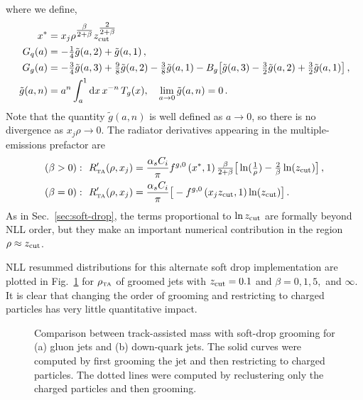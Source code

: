 \documentclass[letterpaper,11pt]{article}
\newcommand{\Fig}[1]{Fig.~\ref{#1}}
\newcommand{\Sec}[1]{Sec.~\ref{#1}}
\begin{document}
where we define,
\begin{align}
x^* &= x_j\rho^{\tfrac{\beta}{2+\beta}}z_{\rm cut}^{\tfrac{2}{2+\beta}} \\
G_q(a) &= -\tfrac{1}{4}\tilde{g}(a,2) + \tilde{g}(a,1)\,,\\
G_g(a) &=  - \tfrac{3}{4}\tilde{g}(a,3) + \tfrac{9}{8}\tilde{g}(a,2) - \tfrac{3}{8}\tilde{g}(a,1) - B_g \big[\tilde{g}(a,3) - \tfrac{3}{2}\tilde{g}(a,2) + \tfrac{3}{2}\tilde{g}(a,1)\big]\,,\\
\tilde{g}(a,n) &= a^n \int_{a}^1\text{d}x\, x^{-n}\,T_g(x), \ \ \ \lim_{a\rightarrow 0} \tilde{g}(a,n) = 0\,.
\end{align}
Note that the quantity $\tilde{g}(a,n)$ is well defined as $a\rightarrow 0$, so there is no divergence as $x_j\rho \rightarrow 0$. 
%
The radiator derivatives appearing in the multiple-emissions prefactor are
\begin{align}
\label{eq:track-first-rderiv-betagt0}
(\beta > 0):& \ \ R_{\mbox{\tiny TA}}'(\rho,x_j) = \frac{\alpha_sC_i}{\pi}f^{g,0}\left(x^*,1\right)\tfrac{\beta}{2+\beta} \big[\ln(\tfrac{1}{\rho})- \tfrac{2}{\beta}\ln(z_{\rm cut})\big]\,, \\ 
\label{eq:track-first-rderiv-betaeq0}
%
(\beta = 0):& \ \ R_{\mbox{\tiny TA}}'(\rho,x_j) = \frac{\alpha_sC_i}{\pi}\big[ - f^{g,0}\left(x_jz_{\rm cut},1\right)\ln(z_{\rm cut})\big] \,.
\end{align}
As in \Sec{sec:soft-drop}, the terms proportional to $\ln z_{\rm cut}$ are formally beyond NLL order, but they make an important numerical contribution in the region $\rho \approx z_{\rm cut}$. 

NLL resummed distributions for this alternate soft drop implementation are plotted in \Fig{fig:sdcomp} for $\rho_{\mbox{\tiny TA}}$ of groomed jets with $z_{\rm cut}= 0.1$ and $\beta = 0,1,5,$ and $\infty$. 
%
It is clear that changing the order of grooming and restricting to charged particles has very little quantitative impact. 

\begin{figure}
	\centering
	\caption{\label{fig:sdcomp}Comparison between track-assisted mass with soft-drop grooming for (a) gluon jets and (b) down-quark jets. The solid curves were computed by first grooming the jet and then restricting to charged particles. The dotted lines were computed by reclustering only the charged particles and then grooming.}
\end{figure}
\end{document}
